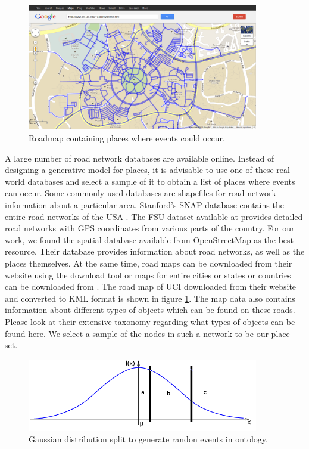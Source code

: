 \begin{figure}[t]
\centering
\includegraphics[width=0.9\textwidth]{media/chapter5/perf/map-locations.png}
\caption{Roadmap containing places where events could occur.}
\label{fig:osm-roadmap-uci}
\end{figure}

A large number of road network databases are available online. Instead of designing a generative model for places, it is advisable to use one of these real world databases and select a sample of it to obtain a list of places where events can occur. Some commonly used databases are shapefiles \cite{esri:tigerline} for road network information about a particular area. Stanford's SNAP database contains the entire road networks of the USA \cite{stanford:snap}. The FSU dataset available at \cite{fsu:spatial} provides detailed road networks with GPS coordinates from various parts of the country. For our work, we found the spatial database available from OpenStreetMap as the best resource. Their database provides information about road networks, as well as the places themselves. At the same time, road maps can be downloaded from their website using the download tool or maps for entire cities or states or countries can be downloaded from \cite{cloudmade:download}. The road map of UCI downloaded from their website and converted to KML format is shown in figure \ref{fig:osm-roadmap-uci}. The map data also contains information about different types of objects which can be found on these roads. Please look at their extensive taxonomy \cite{osm:taxonomy} regarding what types of objects can be found here. We select a sample of the nodes in such a network to be our place set.


\begin{figure}[t]
\centering
\includegraphics[width=0.9\textwidth]{media/chapter5/perf/gaussian-split.png}
\caption{Gaussian distribution split to generate randon events in ontology.}
\label{fig:gaussian-split}
\end{figure}


